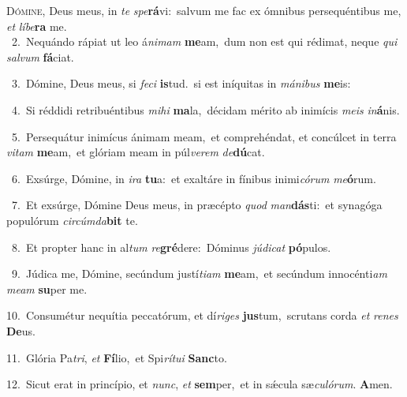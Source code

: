 \lettrine{\initial\textcolor{\initialcolor}{D}}{ómine,} Deus meus, in \textit{te} \textit{spe}\-\textbf{rá}vi:~\star salvum me fac ex ómnibus persequéntibus me, \textit{et} \textit{lí}\-\textit{be}\textbf{ra} me.\\
{\numbfont\textcolor{\numbcolor}{~2.}}~Nequándo rápiat ut leo á\-\textit{ni}\-\textit{mam} \textbf{me}\-am,~\star dum non est qui rédimat, neque \textit{qui} \textit{sal}\-\textit{vum} \textbf{fá}\-ciat.\par
{\numbfont\textcolor{\numbcolor}{~3.}}~Dómine, Deus meus, si \textit{fe}\-\textit{ci} \textbf{is}\-tud.~\star si est iníquitas in \textit{má}\-\textit{ni}\textit{bus} \textbf{me}\-is:\par
{\numbfont\textcolor{\numbcolor}{~4.}}~Si réddidi retribuéntibus \textit{mi}\-\textit{hi} \textbf{ma}\-la,~\star décidam mérito ab inimícis \textit{me}\-\textit{is} \textit{in}\-\textbf{á}nis.\par
{\numbfont\textcolor{\numbcolor}{~5.}}~Persequátur inimícus ánimam meam,~\dagger et comprehéndat, et concúlcet in terra \textit{vi}\-\textit{tam} \textbf{me}\-am,~\star et glóriam meam in púl\-\textit{ve}\-\textit{rem} \textit{de}\-\textbf{dú}cat.\par
{\numbfont\textcolor{\numbcolor}{~6.}}~Exsúrge, Dómine, in \textit{i}\-\textit{ra} \textbf{tu}\-a:~\star et exaltáre in fínibus inimi\-\textit{có}\-\textit{rum} \textit{me}\-\textbf{ó}rum.\par
{\numbfont\textcolor{\numbcolor}{~7.}}~Et exsúrge, Dómine Deus meus, in præcépto \textit{quod} \textit{man}\-\textbf{dás}ti:~\star et synagóga populórum \textit{cir}\-\textit{cúm}\textit{da}\textbf{bit} te.\par
{\numbfont\textcolor{\numbcolor}{~8.}}~Et propter hanc in al\textit{tum} \textit{re}\-\textbf{gré}dere:~\star Dóminus \textit{jú}\-\textit{di}\textit{cat} \textbf{pó}\-pulos.\par
{\numbfont\textcolor{\numbcolor}{~9.}}~Júdica me, Dómine, secúndum justí\-\textit{ti}\-\textit{am} \textbf{me}\-am,~\star et secúndum innocénti\textit{am} \textit{me}\-\textit{am} \textbf{su}\-per me.\par
{\numbfont\textcolor{\numbcolor}{10.}}~Consumétur nequítia peccatórum, et dí\-\textit{ri}\-\textit{ges} \textbf{jus}\-tum,~\star scrutans corda \textit{et} \textit{re}\-\textit{nes} \textbf{De}\-us.\par
{\numbfont\textcolor{\numbcolor}{11.}}~Glória Pa\-\textit{tri}\-, \textit{et} \textbf{Fí}\-lio,~\star et Spi\-\textit{rí}\-\textit{tu}\textit{i} \textbf{Sanc}\-to.\par
{\numbfont\textcolor{\numbcolor}{12.}}~Sicut erat in princípio, et \textit{nunc}\-, \textit{et} \textbf{sem}\-per,~\star et in sǽcula sæ\-\textit{cu}\-\textit{ló}\textit{rum}. \textbf{A}\-men.\par
